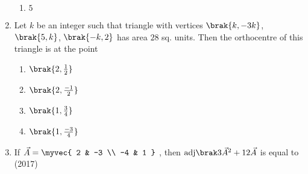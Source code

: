 \begin{enumerate}
\begin{multicols}{4}
\begin{enumerate}
	   	\item $5$ 
	\end{enumerate}
\end{multicols}
	\item Let $k$ be an integer such that triangle with vertices $\brak{k, -3k}$, $\brak{5,k}$, $\brak{-k,2}$ has area $28$ sq. units. Then the orthocentre of this triangle is at the point
	\hfill{}
\begin{multicols}{4}
	\begin{enumerate}
	    	\item $\brak{2,\frac{1}{2}}$ 
	    	\item $\brak{2,\frac{-1}{2}}$ 
	     	\item $\brak{1,\frac{3}{4}}$ 
	    	\item $\brak{1,\frac{-3}{4}}$ 
	\end{enumerate}
\end{multicols}
\item If  $\vec{A}=\myvec{
    2 & -3 \\
    -4 & 1
}$
    , then $\adj{3\vec{A}^2+12\vec{A}}$ is equal to
\hfill{(2017)}
\begin{enumerate}
\end{enumerate}
\end{enumerate}
